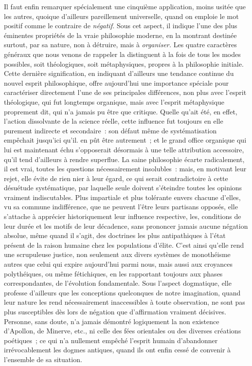 \documentclass[french,twoside]{book} %
\begin{document}
Il faut enfin remarquer spécialement une cinquième application, moins usitée que les autres, quoique d’ailleurs pareillement universelle, quand on emploie le mot positif comme le contraire de {\itshape négatif.} Sous cet aspect, il indique l’une des plus éminentes propriétés de la vraie philosophie moderne, en la montrant destinée surtout, par sa nature, non à détruire, mais à {\itshape organiser.} Les quatre caractères généraux que nous venons de rappeler la distinguent à la fois de tous les modes possibles, soit théologiques, soit métaphysiques, propres à la philosophie initiale. Cette dernière signification, en indiquant d’ailleurs une tendance continue du nouvel esprit philosophique, offre aujourd’hui une importance spéciale pour caractériser directement l’une de ses principales différences, non plus avec l’esprit théologique, qui fut longtemps organique, mais avec l’esprit métaphysique proprement dit, qui n’a jamais pu être que critique. Quelle qu’ait été, en effet, l’action dissolvante de la science réelle, cette influence fut toujours en elle purement indirecte et secondaire : son défaut même de systématisation empêchait jusqu’ici qu’il. en pût être autrement ; et le grand office organique qui lui est maintenant échu s’opposerait désormais à une telle attribution accessoire, qu’il tend d’ailleurs à rendre superflue. La saine philosophie écarte radicalement, il est vrai, toutes les questions nécessairement insolubles : mais, en motivant leur rejet, elle évite de rien nier à leur égard, ce qui serait contradictoire à cette désuétude systématique, par laquelle seule doivent s’éteindre toutes les opinions vraiment indiscutables. Plus impartiale et plus tolérante envers chacune d’elles, vu sa commune indifférence, que ne peuvent l’être leurs partisans opposés, elle s’attache à apprécier historiquement leur influence respective, les, conditions de leur durée et les motifs de leur décadence, sans prononcer jamais aucune négation absolue, même quand il s’agit, des doctrines les plus antipathiques à l’état présent de la raison humaine chez les populations d’élite. C’est ainsi qu’elle rend une scrupuleuse justice, non seulement aux divers systèmes de monothéisme autres que celui qui expire aujourd’hui parmi nous, mais aussi aux croyances polythéiques, ou même fétichiques, en les rapportant toujours aux phases correspondantes, de l’évolution fondamentale. Sous l’aspect dogmatique, elle professe d’ailleurs que les conceptions quelconques de notre imagination, quand leur nature les rend nécessairement inaccessibles à toute observation, ne sont pas plus susceptibles dès lors de négation que d’affirmation vraiment décisives. Personne, sans doute, n’a jamais démontré logiquement la non existence d’Apollon, de Minerve, etc., ni celle des fées orientales ou des diverses créations poétiques ; ce qui n’a nullement empêché l’esprit humain d’abandonner irrévocablement les dogmes antiques, quand ils ont enfin cessé de convenir à l’ensemble de sa situation.\par
\end{document}
